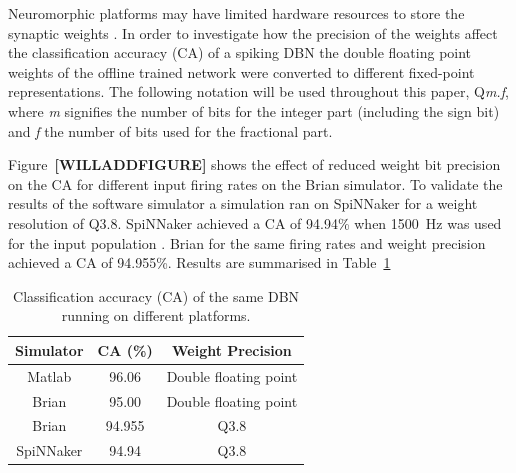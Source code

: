 
Neuromorphic platforms may have limited hardware resources to store the synaptic weights \citep{Schemmel_etal10,Merolla08082014}. In order to investigate how the precision of the weights affect the classification accuracy (CA) of a spiking DBN the double floating point weights of the offline trained network were converted to different fixed-point representations. The following notation will be used throughout this paper, Q\textit{m.f}, where \textit{m} signifies the number of bits for the integer part (including the sign bit) and \textit{f} the number of bits used for the fractional part.

Figure~\textbf{[WILLADDFIGURE]} shows the effect of reduced weight bit precision on the CA for different input firing rates on the Brian simulator. To validate the results of the software simulator a simulation ran on SpiNNaker for a weight resolution of Q3.8. SpiNNaker achieved a CA of 94.94\% when 1500~Hz was used for the input population \citep{SpinnakerDBN2015,iscasSpinnakerAcceptedDemo}. Brian for the same firing rates and weight precision achieved a CA of 94.955\%. Results are summarised in Table~\ref{tab:casimulators}   


\begin{table}[h]
\caption{Classification accuracy (CA) of the same DBN running on different platforms.}
\begin{center}
\begin{tabular} {c|c|c}
	Simulator & CA (\%) & Weight Precision \\
    \hline
    Matlab & 96.06 & Double floating point\\
    Brian & 95.00 & Double floating point\\
    Brian & 94.955 & Q3.8\\
    SpiNNaker & 94.94 & Q3.8\\
\end{tabular}
\label{tab:casimulators}
\end{center}
\end{table}


